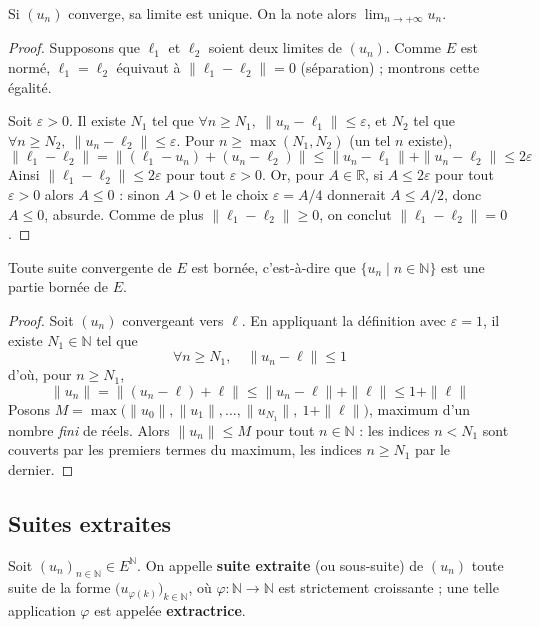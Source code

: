 \begin{prop}
\label{prop:unicite-limite}
Si $(u_n)$ converge, sa limite est unique. On la note alors $\displaystyle\lim_{n\to+\infty}u_n$.
\end{prop}

\begin{proof}
Supposons que $\ell_1$ et $\ell_2$ soient deux limites de $(u_n)$. Comme $E$ est normé, $\ell_1=\ell_2$ équivaut à $\|\ell_1-\ell_2\|=0$ (séparation) ; montrons cette égalité.

Soit $\varepsilon>0$. Il existe $N_1$ tel que $\forall n\geq N_1,\ \|u_n-\ell_1\|\leq\varepsilon$, et $N_2$ tel que $\forall n\geq N_2,\ \|u_n-\ell_2\|\leq\varepsilon$. Pour $n\geq\max(N_1,N_2)$ (un tel $n$ existe),
\[\|\ell_1-\ell_2\| = \|(\ell_1-u_n)+(u_n-\ell_2)\| \leq \|u_n-\ell_1\|+\|u_n-\ell_2\| \leq 2\varepsilon\]
Ainsi $\|\ell_1-\ell_2\|\leq 2\varepsilon$ pour tout $\varepsilon>0$. Or, pour $A\in\mathbb{R}$, si $A\leq 2\varepsilon$ pour tout $\varepsilon>0$ alors $A\leq 0$ : sinon $A>0$ et le choix $\varepsilon=A/4$ donnerait $A\leq A/2$, donc $A\leq 0$, absurde. Comme de plus $\|\ell_1-\ell_2\|\geq 0$, on conclut $\|\ell_1-\ell_2\|=0$.
\end{proof}

\begin{prop}
\label{prop:convergente-bornee}
Toute suite convergente de $E$ est bornée, c'est-à-dire que $\{u_n\mid n\in\mathbb{N}\}$ est une partie bornée de $E$.
\end{prop}

\begin{proof}
Soit $(u_n)$ convergeant vers $\ell$. En appliquant la définition avec $\varepsilon=1$, il existe $N_1\in\mathbb{N}$ tel que
\[\forall n\geq N_1,\quad \|u_n-\ell\|\leq 1\]
d'où, pour $n\geq N_1$,
\[\|u_n\| = \|(u_n-\ell)+\ell\| \leq \|u_n-\ell\|+\|\ell\| \leq 1+\|\ell\|\]
Posons $M=\max\big(\|u_0\|,\|u_1\|,\dots,\|u_{N_1}\|,\ 1+\|\ell\|\big)$, maximum d'un nombre \emph{fini} de réels. Alors $\|u_n\|\leq M$ pour tout $n\in\mathbb{N}$ : les indices $n<N_1$ sont couverts par les premiers termes du maximum, les indices $n\geq N_1$ par le dernier.
\end{proof}

\subsection{Suites extraites}

\begin{defi}
\label{defi:suite-extraite}
Soit $(u_n)_{n\in\mathbb{N}}\in E^{\mathbb{N}}$. On appelle \textbf{suite extraite} (ou sous-suite) de $(u_n)$ toute suite de la forme $\big(u_{\varphi(k)}\big)_{k\in\mathbb{N}}$, où $\varphi:\mathbb{N}\to\mathbb{N}$ est strictement croissante ; une telle application $\varphi$ est appelée \textbf{extractrice}.
\end{defi}

